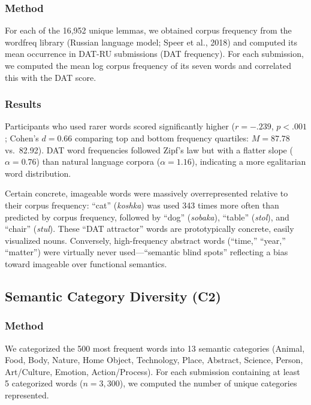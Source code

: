 \documentclass[12pt]{article}
\begin{document}
\subsubsection{Method}

For each of the 16,952 unique lemmas, we obtained corpus frequency from the wordfreq library (Russian language model; Speer et al., 2018) and computed its mean occurrence in DAT-RU submissions (DAT frequency). For each submission, we computed the mean log corpus frequency of its seven words and correlated this with the DAT score.

\subsubsection{Results}

Participants who used rarer words scored significantly higher ($r = -.239$, $p < .001$; Cohen's $d = 0.66$ comparing top and bottom frequency quartiles: $M = 87.78$ vs.\ 82.92). DAT word frequencies followed Zipf's law but with a flatter slope ($\alpha = 0.76$) than natural language corpora ($\alpha = 1.16$), indicating a more egalitarian word distribution.

Certain concrete, imageable words were massively overrepresented relative to their corpus frequency: ``cat'' (\textit{koshka}) was used 343 times more often than predicted by corpus frequency, followed by ``dog'' (\textit{sobaka}), ``table'' (\textit{stol}), and ``chair'' (\textit{stul}). These ``DAT attractor'' words are prototypically concrete, easily visualized nouns. Conversely, high-frequency abstract words (``time,'' ``year,'' ``matter'') were virtually never used---``semantic blind spots'' reflecting a bias toward imageable over functional semantics.

\subsection{Semantic Category Diversity (C2)}

\subsubsection{Method}

We categorized the 500 most frequent words into 13 semantic categories (Animal, Food, Body, Nature, Home Object, Technology, Place, Abstract, Science, Person, Art/Culture, Emotion, Action/Process). For each submission containing at least 5 categorized words ($n = 3{,}300$), we computed the number of unique categories represented.
\end{document}
